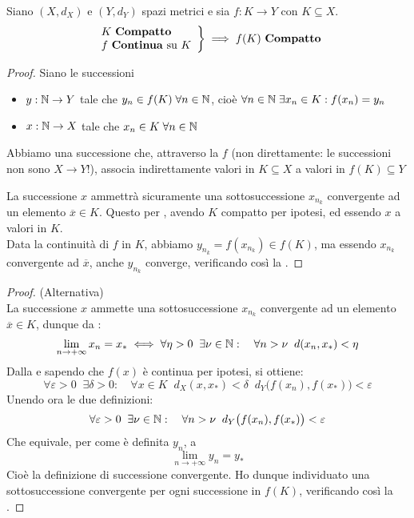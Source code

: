 \begin{theorem}
	\label{teo:weier_generale}
	Siano $(X,d_X)$ e $(Y,d_Y)$ spazi metrici e sia $f:K \to Y$ con $K \subseteq X$.
	\begin{equation*}
		\left.
		\begin{array}{l}
		K \text{ \textbf{Compatto}} \\
		f \text{ \textbf{Continua} su } K
		\end{array}
		\right\} \implies
		f(K) \text{ \textbf{Compatto}}
	\end{equation*}
	\begin{proof}
		Siano le successioni
		\begin{itemize}
			\item $y: \mathbb{N} \to Y$ tale che $y_n \in f(K) \;\forall n \in \mathbb{N}$, cioè $\forall n \in \mathbb{N}\;\exists x_n \in K: f(x_n) = y_n$
			\item $x: \mathbb{N} \to X$ tale che $x_n \in K\;\forall n \in \mathbb{N}$
		\end{itemize}
		\begin{note}
			Abbiamo una successione che, attraverso la $f$ (non direttamente: le successioni non sono $X \to Y$!), associa indirettamente valori in $K \subseteq X$ a valori in $f(K) \subseteq Y$
		\end{note}
		La successione $x$ ammettrà sicuramente una sottosuccessione $x_{n_k}$ convergente ad un elemento $\overline{x} \in K$. Questo per , avendo $K$ compatto per ipotesi, ed essendo $x$ a valori in $K$.\\
		Data la continuità di $f$ in $K$, abbiamo $y_{n_k} = f(x_{n_k}) \in f(K)$, ma essendo $x_{n_k}$ convergente ad $\overline{x}$, anche $y_{n_k}$ converge, verificando così la .
	\end{proof}
	\begin{proof} (Alternativa)\\
		La successione $x$ ammette una sottosuccessione $x_{n_k}$ convergente ad un elemento $\overline{x} \in K$, dunque da :
		\[\lim\limits_{n \to+\infty}x_n=x_*\iff\forall\eta > 0\;\;\exists\nu\in\mathbb{N}:\quad\forall n>\nu\;\;d(x_n,x_*)<\eta\]
		Dalla  e sapendo che $f(x)$ è continua per ipotesi, si ottiene:
		\[\forall\varepsilon > 0\;\;\exists\delta > 0:\quad\forall x \in K\;\;d_X (x,x_*)<\delta\;\;d_Y \bigl(f(x_n),f(x_*)\bigr)<\varepsilon\]
		Unendo ora le due definizioni:
		\[\forall \varepsilon > 0\;\;\exists \nu \in \mathbb{N}:\quad \forall n > \nu\;\;d_Y \bigl(f(x_n),f(x_*)\bigr)<\varepsilon\]
		Che equivale, per come è definita $y_n$, a
		\[\lim\limits_{n \to +\infty}y_n = y_*\]
		Cioè la definizione di successione convergente. Ho dunque individuato una sottosuccessione convergente per ogni successione in $f(K)$, verificando così la .
	\end{proof}
\end{theorem}
